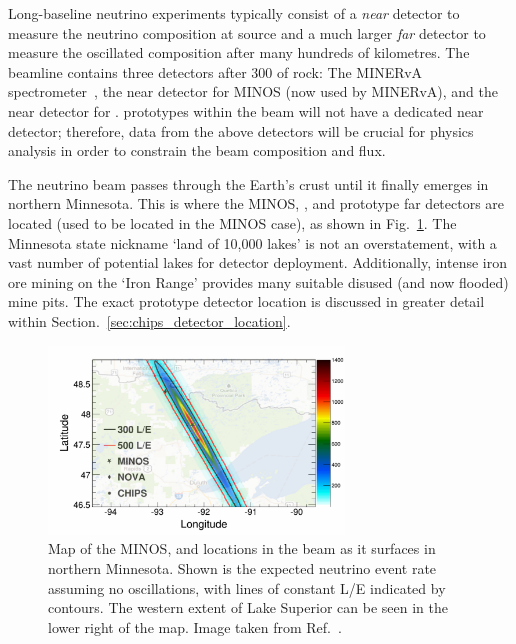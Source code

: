 Long-baseline neutrino experiments typically consist of a \emph{near} detector to measure the
neutrino composition at source and a much larger \emph{far} detector to measure the oscillated
composition after many hundreds of kilometres. The \numi beamline contains three detectors after
\unit{300}{} of rock: The MINERvA spectrometer~\cite{mcfarland2006}, the near detector for
MINOS (now used by MINERvA), and the near detector for \nova. \chips prototypes within the \numi
beam will not have a dedicated near detector; therefore, data from the above detectors will be
crucial for physics analysis in order to constrain the beam composition and flux.

The \numi neutrino beam passes through the Earth's crust until it finally emerges in northern
Minnesota. This is where the MINOS, \nova, and prototype \chips far detectors are located (used to
be located in the MINOS case), as shown in Fig.~\ref{fig:numi_map}. The Minnesota state nickname
`land of 10,000 lakes' is not an overstatement, with a vast number of potential lakes for \chips
detector deployment. Additionally, intense iron ore mining on the `Iron Range' provides many
suitable disused (and now flooded) mine pits. The exact \chipsfive prototype detector location is
discussed in greater detail within Section.~\ref{sec:chips_detector_location}.

\begin{figure} %
    \includegraphics[width=0.7\textwidth]{diagrams/4-chips/numi_map.pdf}
    \caption[Map of detector locations in the \numi beam]
    {Map of the MINOS, \nova and \chips locations in the \numi beam as it surfaces in northern
        Minnesota. Shown is the expected neutrino event rate assuming no oscillations, with lines
        of constant L/E indicated by contours. The western extent of Lake Superior can be seen in
        the lower right of the map. Image taken from Ref.~\cite{adamson2013}.}
    \label{fig:numi_map}
\end{figure}

